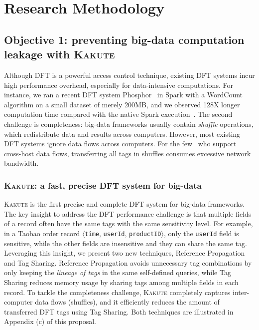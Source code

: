 \documentclass{article}
\let\vv\texttt
\newcommand{\kakute}[0]{\textsc{Kakute}\xspace}
\newcommand{\lazyp}[0]{Reference Propagation\xspace}
\newcommand{\tagcache}[0]{Tag Sharing\xspace}
\begin{document}
\section{Research Methodology}
\subsection{Objective 1: 
preventing big-data computation leakage with \kakute}\label{sec:obj1}
\vspace{-.075in}

Although DFT is a powerful access control technique, existing DFT systems incur 
high performance overhead, especially for data-intensive computations. For 
instance, we ran a recent DFT system Phosphor~\cite{oo14:phosphor} in Spark 
with a WordCount algorithm on a small dataset of merely 200MB, and we observed 
128X longer computation time compared with the native Spark 
execution~\cite{kakute:acsac17}. The second challenge is completeness: 
big-data frameworks usually contain \emph{shuffle} operations, which 
redistribute data and results across computers. However, most existing DFT 
systems ignore data flows across computers. For the 
few~\cite{cloudfence:raid13} who support cross-host data flows, transferring 
all tags in shuffles consumes excessive network bandwidth.

\subsubsection{\kakute: a fast, precise DFT system for big-data} 
\label{sec:kakute}\vspace{-.075in}

\kakute{} is the first precise and complete DFT system for big-data 
frameworks. The key insight to address the DFT performance challenge is that 
multiple fields of a record often have the same tags with the same sensitivity 
level. For example, in a Taobao order record $\langle$\vv{time}, 
\vv{userId}, \vv{productID}$\rangle$, only the \vv{userId} field is 
sensitive, while the other fields are insensitive and they can share the same 
tag. Leveraging this insight, we present two new techniques, \lazyp and 
\tagcache. \lazyp avoids unnecessary tag combinations by only keeping the 
\textit{lineage of tags} in the same self-defined queries, while \tagcache 
reduces memory usage by sharing tags among multiple fields in each record. To 
tackle the completeness challenge, \kakute completely captures inter-computer 
data flows (shuffles), and it efficiently reduces the amount of 
transferred DFT tags using \tagcache. Both techniques are illustrated in 
Appendix (c) of this proposal.
\end{document}
